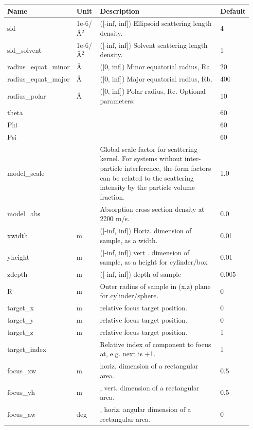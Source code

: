 \begin{longtable}{p{}p{}p{}p{}}
\toprule
\textbf{Name} & \textbf{Unit} & \textbf{Description} & \textbf{Default} \\
\midrule
\endhead
sld & 1e-6/\AA{}$^{2}$ & ([-inf, inf]) Ellipsoid scattering length density. & 4 \\
sld\_solvent & 1e-6/\AA{}$^{2}$ & ([-inf, inf]) Solvent scattering length density. & 1 \\
radius\_equat\_minor & \AA{} & ([0, inf]) Minor equatorial radius, Ra. & 20 \\
radius\_equat\_major & \AA{} & ([0, inf]) Major equatorial radius, Rb. & 400 \\
radius\_polar & \AA{} & ([0, inf]) Polar radius, Rc. Optional parameters: & 10 \\
theta &  &  & 60 \\
Phi &  &  & 60 \\
Psi &  &  & 60 \\
model\_scale &   & Global scale factor for scattering kernel. For systems without inter-particle interference, the form factors can be related to the scattering intensity by the particle volume fraction. & 1.0 \\
model\_abs &   & Absorption cross section density at 2200 m/s. & 0.0 \\
xwidth & m & ([-inf, inf]) Horiz. dimension of sample, as a width. & 0.01 \\
yheight & m & ([-inf, inf]) vert . dimension of sample, as a height for cylinder/box & 0.01 \\
zdepth & m & ([-inf, inf]) depth of sample & 0.005 \\
R & m & Outer radius of sample in (x,z) plane for cylinder/sphere. & 0 \\
target\_x & m & relative focus target position. & 0 \\
target\_y & m & relative focus target position. & 0 \\
target\_z & m & relative focus target position. & 1 \\
target\_index &   & Relative index of component to focus at, e.g. next is +1. & 1 \\
focus\_xw & m & horiz. dimension of a rectangular area. & 0.5 \\
focus\_yh & m & , vert. dimension of a rectangular area. & 0.5 \\
focus\_aw & deg & , horiz. angular dimension of a rectangular area. & 0 \\

\end{longtable}
